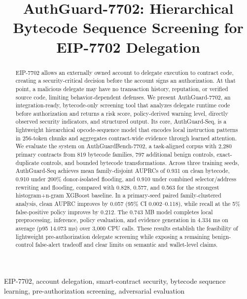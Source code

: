 \documentclass[conference]{IEEEtran}
\newcommand{\system}{AuthGuard-7702}
\newcommand{\model}{AuthGuard-Seq}
\newcommand{\bench}{AuthGuardBench-7702}
\begin{document}
\title{AuthGuard-7702: Hierarchical Bytecode Sequence Screening for EIP-7702 Delegation}

\author{}

\maketitle

\begin{abstract}
EIP-7702 allows an externally owned account to delegate execution to contract code, creating a
security-critical decision before the account signs an authorization. At that point, a malicious
delegate may have no transaction history, reputation, or verified source code, limiting
behavior-dependent defenses. We present \system, an integration-ready, bytecode-only screening
tool that analyzes delegate runtime code before authorization and returns a risk score,
policy-derived warning level, directly observed security indicators, and structured output. Its
core, \model, is a lightweight hierarchical opcode-sequence model that encodes local instruction
patterns in 256-token chunks and aggregates contract-wide evidence through learned attention. We
evaluate the system on \bench, a task-aligned corpus with 2,280 primary contracts from 819
bytecode families, 797 additional benign controls, exact-duplicate controls, and bounded bytecode
transformations. Across three training seeds, \model{} achieves mean family-disjoint AUPRCs of
0.931 on clean bytecode, 0.910 under 200\% donor-isolated flooding, and 0.910 under combined
selector/address rewriting and flooding, compared with 0.828, 0.577, and 0.563 for the strongest
histogram+n-gram XGBoost baseline. In a primary-seed paired family-clustered analysis, clean AUPRC
improves by 0.057 (95\% CI 0.002--0.118), while recall at the 5\% false-positive policy improves
by 0.212. The 0.743 MB model completes local preprocessing, inference, policy evaluation, and
evidence generation in 4.334 ms on average (p95 14.073 ms) over 3,000 CPU calls. These results
establish the feasibility of lightweight pre-authorization delegate screening while exposing a
remaining benign-control false-alert tradeoff and clear limits on semantic and wallet-level
claims.
\end{abstract}

\begin{IEEEkeywords}
EIP-7702, account delegation, smart-contract security, bytecode sequence learning,
pre-authorization screening, adversarial evaluation
\end{IEEEkeywords}
\end{document}
